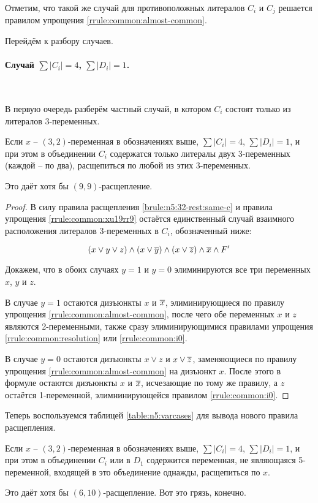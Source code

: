 Отметим, что такой же случай для противоположных литералов $C_i$ и $C_j$ решается правилом упрощения \ref{rrule:common:almost-common}.

Перейдём к разбору случаев.

\paragraph{Случай $\sum |C_i| = 4$, $\sum |D_i| = 1$.}~

В первую очередь разберём частный случай, в котором $C_i$ состоят только из литералов 3-переменных.

\begin{brule}
 Если $x$ -- $(3,2)$-переменная в обозначениях выше, $\sum |C_i| = 4$, $\sum |D_i| = 1$, и при этом в объединении $C_i$ содержатся только литералы двух 3-переменных (каждой -- по два), расщепиться по любой из этих 3-переменных.

 Это даёт хотя бы $(9,9)$-расщепление.
 \label{brule:n5:32-rest:c4:3v}
\end{brule}

\begin{proof}
 В силу правила расщепления \ref{brule:n5:32-rest:same-c} и правила упрощения \ref{rrule:common:xu19rr9} остаётся единственный случай взаимного расположения литералов 3-переменных в $C_i$, обозначенный ниже:

 $$
  (x \vee y \vee z) \wedge (x \vee \overline{y}) \wedge (x \vee \overline{z}) \wedge \overline{x} \wedge F'
 $$

 Докажем, что в обоих случаях $y = 1$ и $y = 0$ элиминируются все три переменных $x$, $y$ и $z$.

 В случае $y = 1$ остаются дизъюнкты $x$ и $\overline{x}$, элиминирующиеся по правилу упрощения \ref{rrule:common:almost-common}, после чего обе переменных $x$ и $z$ являются 2-переменными, также сразу элиминирующимися правилами упрощения \ref{rrule:common:resolution} или \ref{rrule:common:i0}.

 В случае $y = 0$ остаются дизъюнкты $x \vee z$ и $x \vee \overline{z}$, заменяющиеся по правилу упрощения \ref{rrule:common:almost-common} на дизъюнкт $x$. После этого в формуле остаются дизъюнкты $x$ и $\overline{x}$, исчезающие по тому же правилу, а $z$ остаётся 1-переменной, элимнинирующейся правилом \ref{rrule:common:i0}.
\end{proof}

Теперь воспользуемся таблицей \ref{table:n5:varcases} для вывода нового правила расщепления.

\begin{brule}
 Если $x$ -- $(3,2)$-переменная в обозначениях выше, $\sum |C_i| = 4$, $\sum |D_i| = 1$, и при этом в объединении $C_i$ или в $D_1$ содержится переменная, не являющаяся 5-переменной, входящей в это объединение однажды, расщепиться по $x$.

 Это даёт хотя бы $(6,10)$-расщепление.
{\color{white} Вот это грязь, конечно.}
 \label{brule:n5:32-rest:c4:not-5v}
\end{brule}


